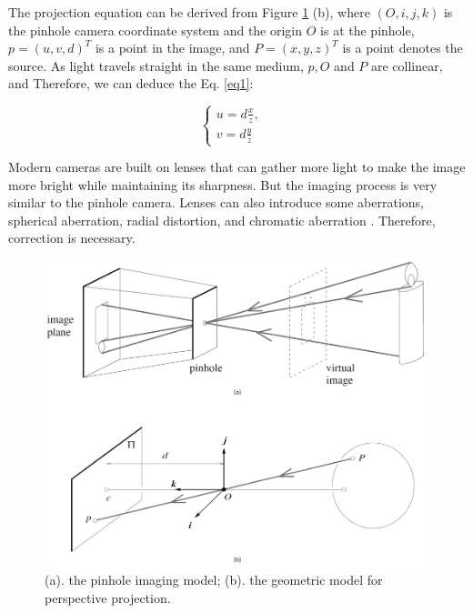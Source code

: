 \documentclass[a4paper,12pt]{article}
\begin{document}
The projection equation can be derived from Figure \ref{figure:camera} (b), where $ (O, i, j, k) $ is the pinhole camera coordinate system and the origin $O$ is at the pinhole,  $p=(u, v, d)^T$ is a point in the image, and   $P=(x, y, z)^T$ is a point denotes the source. As light travels straight in the same medium, $p, O$ and $P$ are collinear, and Therefore, we can deduce the Eq. \ref{eq1}: 

\begin{equation}
\label{eq1}
	\begin{cases}
	u = d\frac{x}{z}, & \\    
	v = d\frac{y}{z}   
	\end{cases}
\end{equation}

Modern cameras are built on lenses that can gather more light to make the image more bright while maintaining its sharpness. But the imaging process is very similar to the pinhole camera. Lenses can also introduce some aberrations, \eg spherical aberration, radial distortion, and chromatic aberration \cite{Forsyth:2002:CVM:580035}. Therefore, correction is necessary.

\begin{figure}[h]		
	\includegraphics[width=1\textwidth]{camera.png}
	\caption[Pinhole camera model and perspective projection.]{(a). the pinhole imaging model; (b). the geometric model for perspective projection. \cite{Forsyth:2002:CVM:580035}}
	\centering
	\label{figure:camera}
\end{figure}
\end{document}
